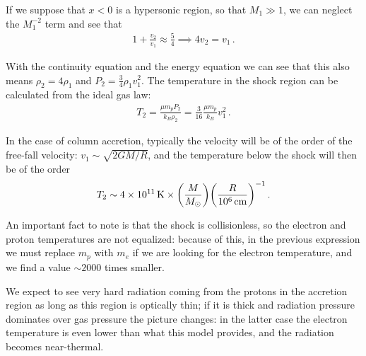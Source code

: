 \documentclass[main.tex]{subfiles}
\begin{document}
If we suppose that \(x<0\) is a hypersonic region, so that \(M_1 \gg 1\), we can neglect the \(M_1^{-2}\) term and see that 
%
\begin{align}
1 + \frac{v_2}{v_1 } \approx \frac{5}{4} \implies 4 v_2 = v_1 
\,.
\end{align}

With the continuity equation and the energy equation we can see that this also means \(\rho_2 = 4 \rho_1 \) and \(P_2 = \frac{3}{4} \rho_1 v_1^2\). 
The temperature in the shock region can be calculated from the ideal gas law: 
%
\begin{align}
T_2 = \frac{\mu m_p P_2 }{k_B \rho_2 } = \frac{3}{16} \frac{\mu m_p}{k_B} v_1^2
\,.
\end{align}

In the case of column accretion, typically the velocity will be of the order of the free-fall velocity: \(v_1 \sim \sqrt{ 2GM / R}\), and the temperature below the shock will then be of the order 
%
\begin{align}
T_2 \sim \SI{4e11}{K} \times \qty( \frac{M}{M_{\odot}} ) \qty( \frac{R}{\SI{e6}{cm}})^{-1}
\,.
\end{align}

An important fact to note is that the shock is collisionless, so the electron and proton temperatures are not equalized: because of this, in the previous expression we must replace \(m_p\) with \(m_e\) if we are looking for the electron temperature, and we find a value \(\sim 2000\) times smaller.

We expect to see very hard radiation coming from the protons in the accretion region as long as this region is optically thin; if it is thick and radiation pressure dominates over gas pressure the picture changes: in the latter case the electron temperature is even lower than what this model provides, and the radiation becomes near-thermal. 
\end{document}
